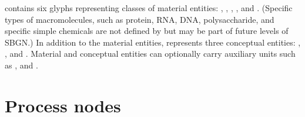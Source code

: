 \SBGNPDLone{} contains six glyphs representing classes of material entities: , , , ,  and .  (Specific types of macromolecules, such as protein, RNA, DNA, polysaccharide, and specific simple chemicals are not defined by \SBGNPDLone but may be part of future levels of SBGN.)  In addition to the material entities, \SBGNPDLone{} represents three conceptual entities: , , and .  Material and conceptual entities can optionally carry auxiliary units such as ,  and .



























\section{Process nodes}\label{sec:PNs}

